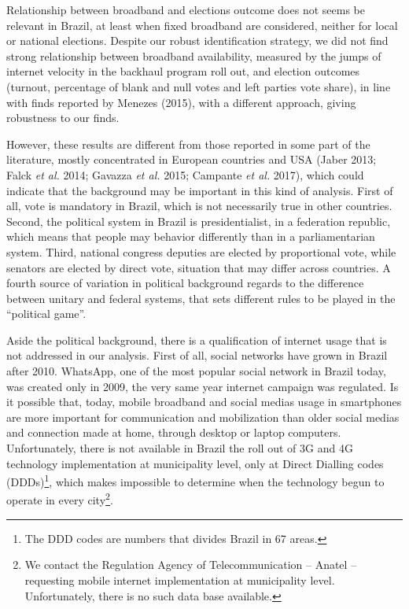 \documentclass[
  12pt,
]{article}
\begin{document}
Relationship between broadband and elections outcome does not seems be
relevant in Brazil, at least when fixed broadband are considered,
neither for local or national elections. Despite our robust
identification strategy, we did not find strong relationship between
broadband availability, measured by the jumps of internet velocity in
the backhaul program roll out, and election outcomes (turnout,
percentage of blank and null votes and left parties vote share), in line
with finds reported by Menezes (2015), with a different approach, giving
robustness to our finds.

However, these results are different from those reported in some part of
the literature, mostly concentrated in European countries and USA (Jaber
2013; Falck \emph{et al.} 2014; Gavazza \emph{et al.} 2015; Campante
\emph{et al.} 2017), which could indicate that the background may be
important in this kind of analysis. First of all, vote is mandatory in
Brazil, which is not necessarily true in other countries. Second, the
political system in Brazil is presidentialist, in a federation republic,
which means that people may behavior differently than in a
parliamentarian system. Third, national congress deputies are elected by
proportional vote, while senators are elected by direct vote, situation
that may differ across countries. A fourth source of variation in
political background regards to the difference between unitary and
federal systems, that sets different rules to be played in the
``political game''.

Aside the political background, there is a qualification of internet
usage that is not addressed in our analysis. First of all, social
networks have grown in Brazil after 2010. WhatsApp, one of the most
popular social network in Brazil today, was created only in 2009, the
very same year internet campaign was regulated. Is it possible that,
today, mobile broadband and social medias usage in smartphones are more
important for communication and mobilization than older social medias
and connection made at home, through desktop or laptop computers.
Unfortunately, there is not available in Brazil the roll out of 3G and
4G technology implementation at municipality level, only at Direct
Dialling codes (DDDs)\footnote{The DDD codes are numbers that divides
  Brazil in 67 areas.}, which makes impossible to determine when the
technology begun to operate in every city\footnote{We contact the
  Regulation Agency of Telecommunication -- Anatel -- requesting mobile
  internet implementation at municipality level. Unfortunately, there is
  no such data base available.}.
\end{document}
